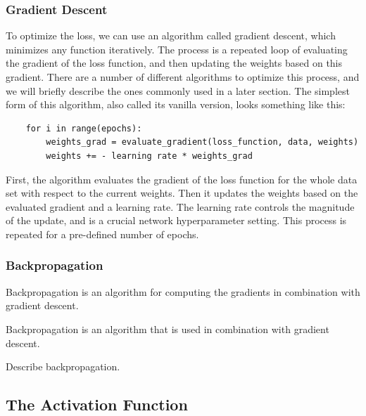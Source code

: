 \subsubsection{Gradient Descent}

\noindent To optimize the loss, we can use an algorithm called gradient descent, which minimizes any function iteratively. The process is a repeated loop of evaluating the gradient of the loss function, and then updating the weights based on this gradient. There are a number of different algorithms to optimize this process, and we will briefly describe the ones commonly used in a later section. The simplest form of this algorithm, also called its vanilla version, looks something like this: \\

\begin{lstlisting}
    for i in range(epochs):
        weights_grad = evaluate_gradient(loss_function, data, weights)
        weights += - learning rate * weights_grad
\end{lstlisting}

\noindent First, the algorithm evaluates the gradient of the loss function for the whole data set with respect to the current weights. Then it updates the weights based on the evaluated gradient and a learning rate. The learning rate controls the magnitude of the update, and is a crucial network hyperparameter setting. This process is repeated for a pre-defined number of epochs.

\subsubsection{Backpropagation}

\noindent Backpropagation is an algorithm for computing the gradients in combination with gradient descent.

Backpropagation is an algorithm that is used in combination with gradient descent. 

\noindent Describe backpropagation.

\subsection{The Activation Function}

